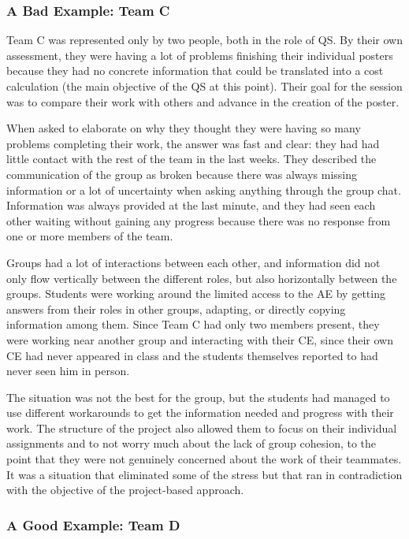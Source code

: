 \subsubsection{A Bad Example: Team C \label{sec:6-5-1-1}}

Team C was represented only by two people, both in the role of \ac{QS}. By their own assessment, they were having a lot of problems finishing their individual posters
because they had no concrete information that could be translated into a cost calculation (the main objective of the \ac{QS} at this point). Their goal for the session was
to compare their work with others and advance in the creation of the poster.

When asked to elaborate on why they thought they were having so many problems completing their work, the answer was fast and clear: they had had little contact with the
rest of the team in the last weeks. They described the communication of the group as broken because there was always missing information or a lot of uncertainty when asking
anything through the group chat. Information was always provided at the last minute, and they had seen each other waiting without gaining any progress because there was no
response from one or more members of the team.

Groups had a lot of interactions between each other, and information did not only flow vertically between the different roles, but also horizontally between the groups.
Students were working around the limited access to the \ac{AE} by getting answers from their roles in other groups, adapting, or directly copying information among them.
Since Team C had only two members present, they were working near another group and interacting with their \ac{CE}, since their own \ac{CE} had never appeared in class and
the students themselves reported to had never seen him in person.

The situation was not the best for the group, but the students had managed to use different workarounds to get the information needed and progress with their work. The
structure of the project also allowed them to focus on their individual assignments and to not worry much about the lack of group cohesion, to the point that they were not
genuinely concerned about the work of their teammates. It was a situation that eliminated some of the stress but that ran in contradiction with the objective of the
project-based approach.

\subsubsection{A Good Example: Team D \label{sec:6-5-1-2}}

